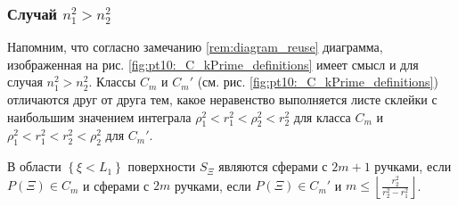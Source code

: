 \subsubsection{Случай $n_1^2 > n_2^2$}\label{sec:ch4/sec3/subsec8/subsec2}
Напомним, что согласно замечанию \ref{rem:diagram_reuse} диаграмма, изображенная на рис. \ref{fig:pt10:_C_kPrime_definitions} имеет смысл и для  случая $n_1^2 > n_2^2$. Классы $C_m$ и $C_m'$ (см. рис. \ref{fig:pt10:_C_kPrime_definitions}) отличаются друг от друга тем, какое неравенство выполняется листе склейки с наибольшим значением интеграла $\rho_1^2 < r_1^2 < \rho_2^2 < r_2^2$ для класса $C_m$ и $\rho_1^2 < r_1^2 < r_2^2 < \rho_2^2$ для $C_m'$.
\begin{theorem}
В области $\left\{\xi < L_1\right\}$ поверхности $S_\Xi$ являются сферами с $2m+1$ ручками, если $P(\Xi) \in C_m$ и сферами с $2m$ ручками, если $P(\Xi) \in C_m'$ и $m \leq \left\lfloor \frac{r_2^2}{r_2^2-r_1^2} \right\rfloor$. 
\label{th:pt10:th2}
\end{theorem}
